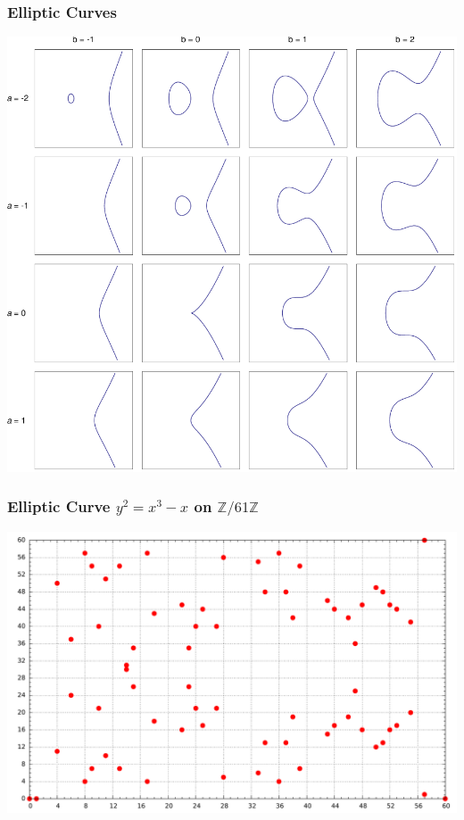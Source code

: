 \documentclass{beamer}
\newcommand{\zmod}[1]{\ensuremath{\mathbb{Z}/#1\mathbb{Z}}}
\begin{document}
    \begin{frame}
        \frametitle{Elliptic Curves}
        \centering
        \includegraphics[height=.9\textheight]{EllipticCurveCatalog.pdf}
    \end{frame}

    \begin{frame}
        \frametitle{Elliptic Curve \(y^2 = x^3 - x\) on \zmod{61}}
        \centering
        \includegraphics[width=\textwidth]{Z61.pdf}
    \end{frame}
\end{document}
